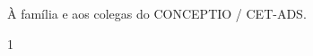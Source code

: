\maketitle

\begin{itadedication}
À família e aos colegas do CONCEPTIO / CET-ADS.
\end{itadedication}

\begin{itathanks}

\end{itathanks}

\ifhyperref{}\fi
\begin{flushright}
\begin{spacing}{1}
\mbox{}\vfill

\end{spacing}
\end{flushright}

\begin{abstract}
\noindent

\end{abstract}

\begin{englishabstract}
\noindent

\end{englishabstract}

\listoffigures
\listoftables
\listofabbreviations
\listofsymbols
\tableofcontents
